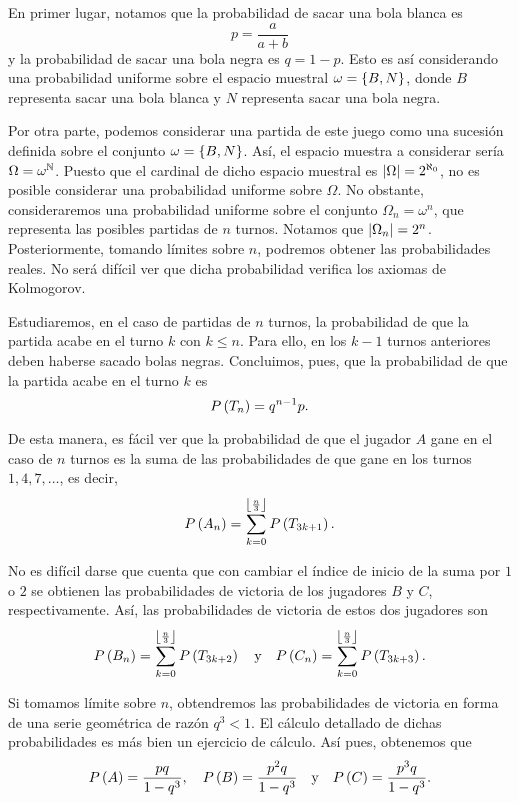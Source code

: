 \begin{solution}
  En primer lugar, notamos que la probabilidad de sacar una bola blanca es
  \[
    p = \frac{a}{a + b}
  \]
  y la probabilidad de sacar una bola negra es $q = 1 - p$. Esto es así
  considerando una probabilidad uniforme sobre el espacio muestral
  $\omega = \left\lbrace B, N\right\rbrace$, donde $B$ representa sacar una bola blanca y $N$
  representa sacar una bola negra.

  Por otra parte, podemos considerar una partida de este juego como una
  sucesión definida sobre el conjunto $\omega = \left\lbrace B, N\right\rbrace$. Así, el
  espacio muestra a considerar sería $\Omega = \omega^{\mathbb{N}}$. Puesto que el
  cardinal de dicho espacio muestral es $\left|\Omega\right| = 2^{\aleph_0}$, no
  es posible considerar una probabilidad uniforme sobre $\Omega$. No
  obstante, consideraremos una probabilidad uniforme sobre el conjunto
  $\Omega_n = \omega^n$, que representa las posibles partidas de $n$
  turnos. Notamos que $\left|\Omega_n\right| = 2^n$. Posteriormente, tomando
  límites sobre $n$, podremos obtener las probabilidades reales. No será
  difícil ver que dicha probabilidad verifica los axiomas de Kolmogorov.

  Estudiaremos, en el caso de partidas de $n$ turnos, la probabilidad de
  que la partida acabe en el turno $k$ con $k \le n$. Para ello, en 
  los $k - 1$ turnos anteriores deben haberse sacado bolas negras.
  Concluimos, pues, que la probabilidad de que la partida acabe en el
  turno $k$ es
  \[
    P\left(T_n\right) = q^{n - 1} p.
  \]

  De esta manera, es fácil ver que la probabilidad de que el jugador $A$
  gane en el caso de $n$ turnos es la suma de las probabilidades de que
  gane en los turnos $1, 4, 7, \ldots$, es decir,
  \[
    P\left(A_n\right) = \sum_{k = 0}^{\left\lfloor\frac{n}{3}\right\rfloor} P\left(T_{3k + 1}\right).
  \]

  No es difícil darse que cuenta que con cambiar el índice de inicio de la
  suma por $1$ o $2$ se obtienen las probabilidades de victoria de los
  jugadores $B$ y $C$, respectivamente. Así, las probabilidades de victoria
  de estos dos jugadores son
  \[
    P\left(B_n\right) = \sum_{k = 0}^{\left\lfloor\frac{n}{3}\right\rfloor} P\left(T_{3k + 2}\right)
    \quad \text{y} \quad
    P\left(C_n\right) = \sum_{k = 0}^{\left\lfloor\frac{n}{3}\right\rfloor} P\left(T_{3k + 3}\right).
  \]

  Si tomamos límite sobre $n$, obtendremos las probabilidades de victoria
  en forma de una serie geométrica de razón $q^3 < 1$. El cálculo detallado
  de dichas probabilidades es más bien un ejercicio de cálculo. Así pues,
  obtenemos que
  \[
    P\left(A\right) = \frac{pq}{1 - q^3}, \quad
    P\left(B\right) = \frac{p^2q}{1 - q^3} \quad \text{y} \quad
    P\left(C\right) = \frac{p^3q}{1 - q^3}.
  \]
\end{solution}

